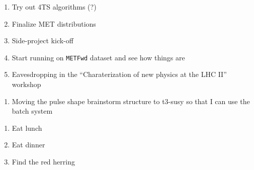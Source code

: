 

\begin{enumerate}
\item Try out 4TS algorithms (?)
\item Finalize MET distributions
\item Side-project kick-off
\item Start running on \texttt{METFwd} dataset and see how things are
\item Eavesdropping in the ``Charaterization of new physics at the LHC II'' workshop
\end{enumerate}


\begin{enumerate}
\item Moving the pulse shape brainstorm structure to t3-susy so that I can use the batch system
\end{enumerate}



\begin{enumerate}
\item Eat lunch
\item Eat dinner
\item Find the red herring
\end{enumerate}


